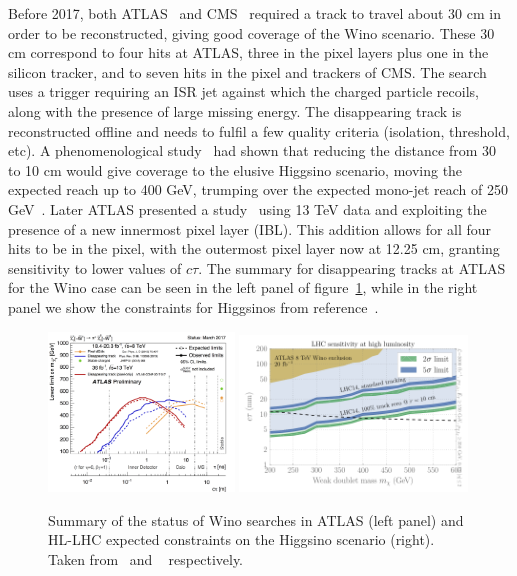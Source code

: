 Before 2017, both ATLAS~\cite{Aad:2013yna} and CMS~\cite{CMS:2014gxa} required a track to travel about 30 cm in order to be reconstructed, giving good coverage of the Wino scenario. These 30 cm correspond to four hits at ATLAS, three in the pixel layers plus one in the silicon tracker, and to seven hits in the pixel and trackers of CMS. The search uses a trigger requiring an ISR jet against which the charged particle recoils, along with the presence of large missing energy. The disappearing track is reconstructed offline and needs to fulfil a few quality criteria (isolation, \pT threshold, etc). A phenomenological study~\cite{Mahbubani:2017gjh} had shown that reducing the distance from 30 to 10 cm would give coverage to the elusive Higgsino scenario, moving the expected reach up to 400 GeV, trumping over the expected mono-jet reach of 250 GeV~\cite{Schwaller:2013baa,Low:2014cba,Barducci:2015ffa}. Later ATLAS presented a study~\cite{ATLAS-CONF-2017-017} using 13 TeV data and exploiting the presence of a new innermost pixel layer (IBL). This addition allows for all four hits to be in the pixel, with the outermost pixel layer now at 12.25 cm,  granting sensitivity to lower values of $c \tau$. The summary for disappearing tracks at ATLAS for the Wino case can be seen in the left panel of figure~\ref{fig:ewkinosearches}, while in the right panel we show the constraints for Higgsinos from reference~\cite{Mahbubani:2017gjh}.

\begin{figure}[htb]
\centering
\includegraphics[width=0.44\textwidth]{plots/ATLAS_SUSY_LLPChargino.png}
\includegraphics[width=0.54\textwidth]{plots/Higgsino_Significance14}
\caption{Summary of the status of Wino searches in ATLAS (left panel) and HL-LHC expected constraints on the Higgsino scenario (right). Taken from~\cite{ATLAS:summary} and ~\cite{Mahbubani:2017gjh} respectively.}
  \label{fig:ewkinosearches}
\end{figure}

